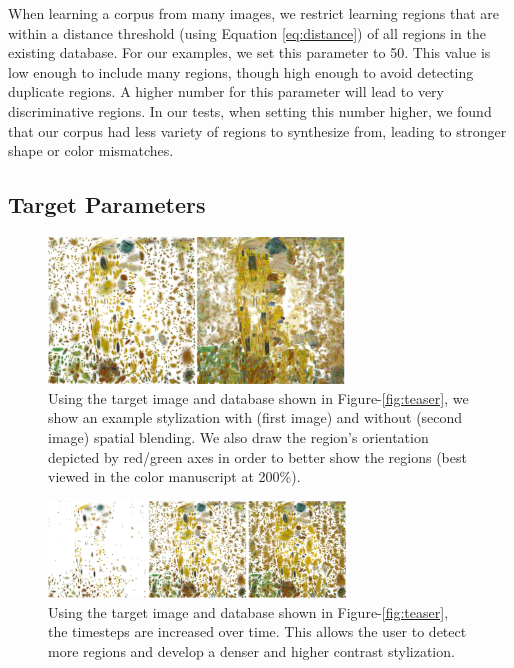 \documentclass[a4paper,10pt,final]{ThesisStyle}
\begin{document}
When learning a corpus from many images, we restrict learning regions that are within a distance threshold (using Equation \ref{eq:distance}) of all regions in the existing database.  For our examples, we set this parameter to 50.  This value is low enough to include many regions, though high enough to avoid detecting duplicate regions.  A higher number for this parameter will lead to very discriminative regions.  In our tests, when setting this number higher, we found that our corpus had less variety of regions to synthesize from, leading to stronger shape or color mismatches.  
\subsection{Target Parameters}\vspace{-0.4em}
\begin{figure}[ht]
  \centering
  \includegraphics[width=3.1in]{images/spatial-blending-3.png}
  
  \caption{Using the target image and database shown in Figure-\ref{fig:teaser}, we show an example stylization with (first image) and without (second image) spatial blending.  We also draw the region's orientation depicted by red/green axes in order to better show the regions (best viewed in the color manuscript at 200\%).}
  \label{fig:spatial-blending}
\end{figure}
\begin{figure}[ht]
  \centering
  \includegraphics[width=3.1in]{images/increasing-timesteps-2.png}
  
  \caption{Using the target image and database shown in Figure-\ref{fig:teaser}, the timesteps are increased over time.  This allows the user to detect more regions and develop a denser and higher contrast stylization.}
  \label{fig:timesteps}
\end{figure}
\end{document}
